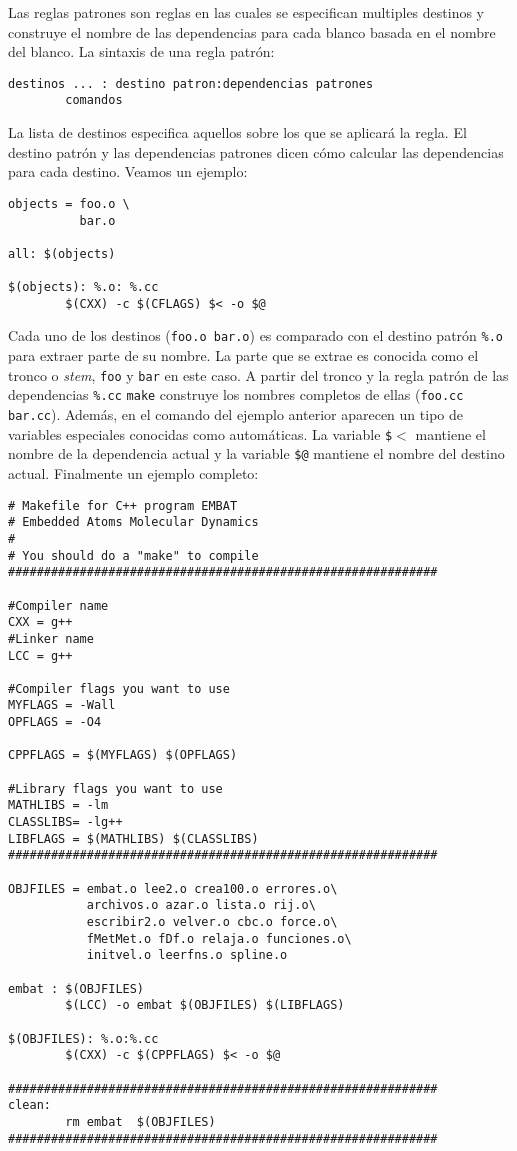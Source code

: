 Las reglas patrones son reglas en las cuales se especifican multiples
destinos y construye el nombre de las dependencias para cada blanco
basada en el nombre del blanco. La sintaxis de una regla patr{\'o}n:
\begin{verbatim}
destinos ... : destino patron:dependencias patrones
        comandos
\end{verbatim}
La lista de destinos especifica aquellos sobre los que se aplicar{\'a} la
regla. El destino patr{\'o}n y las dependencias patrones dicen c{\'o}mo
calcular las dependencias para cada destino. Veamos un ejemplo:
\begin{verbatim}
objects = foo.o \
          bar.o

all: $(objects)

$(objects): %.o: %.cc
        $(CXX) -c $(CFLAGS) $< -o $@
\end{verbatim}
Cada uno de los destinos (\verb+foo.o bar.o+) es comparado con el
destino patr{\'o}n {\tt \%.o} para extraer parte de su nombre. La parte que
se extrae es conocida como el tronco o {\it stem}, \verb+foo+ y
\verb+bar+ en este caso. A partir del tronco y la regla patr{\'o}n de las
dependencias {\tt \%.cc} \verb+make+ construye los nombres completos de
ellas (\verb+foo.cc bar.cc+).  Adem{\'a}s, en el comando del ejemplo
anterior aparecen un tipo de variables especiales conocidas como
autom{\'a}ticas. La variable {\tt \$$<$} mantiene el nombre de la
dependencia actual y la variable {\tt \$@} mantiene el nombre del
destino actual.  Finalmente un ejemplo completo:
\begin{verbatim}
# Makefile for C++ program EMBAT 
# Embedded Atoms Molecular Dynamics
#
# You should do a "make" to compile 
############################################################

#Compiler name
CXX = g++
#Linker name
LCC = g++

#Compiler flags you want to use 
MYFLAGS = -Wall 
OPFLAGS = -O4

CPPFLAGS = $(MYFLAGS) $(OPFLAGS)  

#Library flags you want to use 
MATHLIBS = -lm 
CLASSLIBS= -lg++
LIBFLAGS = $(MATHLIBS) $(CLASSLIBS)
############################################################

OBJFILES = embat.o lee2.o crea100.o errores.o\
           archivos.o azar.o lista.o rij.o\
           escribir2.o velver.o cbc.o force.o\
           fMetMet.o fDf.o relaja.o funciones.o\
           initvel.o leerfns.o spline.o

embat : $(OBJFILES)
        $(LCC) -o embat $(OBJFILES) $(LIBFLAGS)

$(OBJFILES): %.o:%.cc
        $(CXX) -c $(CPPFLAGS) $< -o $@ 

############################################################
clean:
        rm embat  $(OBJFILES) 
############################################################

\end{verbatim}


